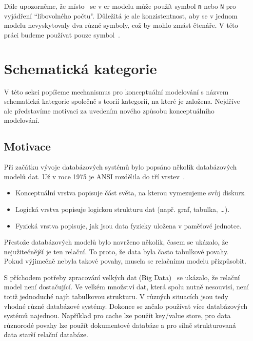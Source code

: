 Dále upozorněme, že místo~\many{} se v \acrshort{er} modelu může použít symbol \texttt{n} nebo \texttt{N} pro vyjádření \enquote{libovolného počtu}.
Důležitá je ale konzistentnost, aby se v jednom modelu nevyskytovaly dva různé symboly, což by mohlo zmást čtenáře.
V této práci budeme používat pouze symbol~\many{}.

\section{Schematická kategorie}\label{section:schemcat}

V této sekci popíšeme mechanismus pro konceptuální modelování s názvem schematická kategorie společně s teorií kategorií, na které je založena.
Nejdříve ale představíme motivaci za uvedením nového způsobu konceptuálního modelování.

\subsection{Motivace}

Při začátku vývoje databázových systémů bylo popsáno několik databázových modelů dat.
Už v roce 1975 je ANSI rozdělila do tří vrstev~\cite{steeljr._interimreport_1975}.
\begin{itemize}
  \item Konceptuální vrstva popisuje část světa, na kterou vymezujeme svůj diskurz.
  \item Logická vrstva popisuje logickou strukturu dat (např. graf, tabulka, \dots).
  \item Fyzická vrstva popisuje, jak jsou data fyzicky uložena v paměťové jednotce.
\end{itemize}

Přestože databázových modelů bylo navrženo několik, časem se ukázalo, že nejužitečnější je ten relační.
To proto, že data byla často tabulkové povahy.
Pokud výjimečně nebyla takové povahy, musela se relačnímu modelu přizpůsobit.

S příchodem potřeby zpracování velkých dat (Big Data)~\cite{cron_bigdata_2012} se ukázalo, že relační model není dostačující.
Ve velkém množství dat, která spolu nutně nesouvisí, není totiž jednoduché najít tabulkovou strukturu.
V různých situacích jsou tedy vhodné různé databázové systémy.
Dokonce se začalo používat více databázových systémů najednou.
Například pro cache lze použít key/value store, pro data různorodé povahy lze použít dokumentové databáze a pro silně strukturovaná data starší relační databáze.

